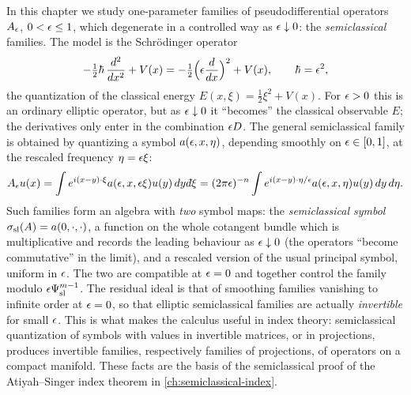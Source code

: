 In this chapter we study one-parameter families of pseudodifferential
operators $A_\epsilon$, $0<\epsilon\le1$, which degenerate in a controlled way as
$\epsilon\downarrow0$: the \emph{semiclassical} families. The model is the
Schr\"odinger operator
\begin{equation*}
  -\tfrac12\hbar\,\frac{d^2}{dx^2}+V(x)=-\tfrac12\Bigl(\epsilon\frac{d}{dx}\Bigr)^2+V(x),
  \qquad\hbar=\epsilon^2,
\end{equation*}
the quantization of the classical energy $E(x,\xi)=\frac12\xi^2+V(x)$. For
$\epsilon>0$ this is an ordinary elliptic operator, but as $\epsilon\downarrow0$ it
``becomes'' the classical observable $E$; the derivatives only enter in the
combination $\epsilon D$. The general semiclassical family is obtained by
quantizing a symbol $a(\epsilon,x,\eta)$, depending smoothly on $\epsilon\in[0,1]$, at
the rescaled frequency $\eta=\epsilon\xi$:
\begin{equation*}
  A_\eps u(x)=\int e^{i(x-y)\cdot\xi}a(\eps,x,\eps\xi)u(y)\,dy\,\dbar\xi
  =(2\pi\eps)^{-n}\int e^{i(x-y)\cdot\eta/\eps}a(\eps,x,\eta)u(y)\,dy\,d\eta.
\end{equation*}
Such families form an algebra with \emph{two} symbol maps: the
\emph{semiclassical symbol} $\sigma_{\mathrm{sl}}(A)=a(0,\cdot,\cdot)$, a function on the
whole cotangent bundle which is multiplicative and records the leading
behaviour as $\epsilon\downarrow0$ (the operators ``become commutative'' in the
limit), and a rescaled version of the usual principal symbol, uniform in
$\epsilon$. The two are compatible at $\epsilon=0$ and together control the family
modulo $\epsilon\Psi^{m-1}_{\mathrm{sl}}$. The residual ideal is that of smoothing families
vanishing to infinite order at $\epsilon=0$, so that elliptic semiclassical
families are actually \emph{invertible} for small $\epsilon$. This is what makes
the calculus useful in index theory: semiclassical quantization of symbols
with values in invertible matrices, or in projections, produces invertible
families, respectively families of projections, of operators on a compact
manifold. These facts are the basis of the semiclassical proof of the
Atiyah--Singer index theorem in \cref{ch:semiclassical-index}.

